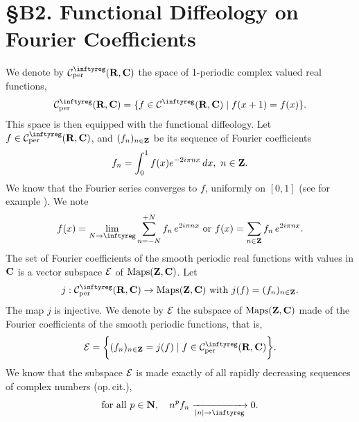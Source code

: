 
\chapter*{\S B2. Functional Diffeology on Fourier Coefficients}
\setcounter{footnote}{0}

\begin{abstract}
  In this exercise we transfer the functional diffeology defined on smooth complex periodic
  functions to the space of Fourier coefficients of smooth complex periodic functions.
\end{abstract}


We denote by $\Cinfty_{\rm per}(\RR,\CC)$ the space of 1-periodic complex valued real functions,
$$
  \Cinfty_{\rm per}(\RR,\CC) = \{f \in \Cinfty(\RR,\CC) \mid f(x+1) = f(x) \}.
  $$
This space is then equipped with the functional diffeology.
Let $f \in \Cinfty_{\rm per}(\RR,\CC)$, and $(f_n)_{n\in \mathbf{Z}}$ be its sequence of Fourier coefficients
$$
  f_n = \int_0^1 f(x) e^{-2i\pi n x} \, dx, \ n \in \mathbf{Z}.
  $$
We know that the Fourier series converges to $f$, uniformly on $[0,1]$
(see for example \cite[\textsection\,2 Thm. 1]{Vil68}). We note
$$
  f(x) = \lim_{N \to \infty} \sum_{n=-N}^{+N} f_n\,e^{2i\pi n x} \SpacedText{or} f(x)=\sum_{n \in \ZZ} f_n\,e^{2i\pi n x}.
  $$
The set of Fourier coefficients of the smooth periodic real functions with values in $\mathbf{C}$
is a vector subspace $\mathcal{E}$ of $\mathrm{Maps}(\mathbf{Z},\mathbf{C})$. Let
$$
  j : \Cinfty_{\rm per}(\RR,\CC) \to \Maps(\ZZ,\CC) \SpacedText{with} j(f) = (f_n)_{n\in \ZZ}.
  $$
The map $j$ is injective. We denote by $\mathcal{E}$ the subspace of $\mathrm{Maps}(\mathbf{Z},\mathbf{C})$ made of the Fourier coefficients of
the smooth periodic functions, that is,
$$
  \cE = \bigg\{ (f_n)_{n\in\ZZ} = j(f) \mid f \in \Cinfty_{\rm per}(\RR,\CC)\bigg\}.
  $$
We know that the subspace $\mathcal{E}$ is made exactly of all rapidly decreasing sequences of complex numbers (op.\,cit.),
$$
  \mbox{for all $p \in \NN$}, \quad n^p f_n \xrightarrow[\Modulus{n} \to \infty]{} 0.
  $$

